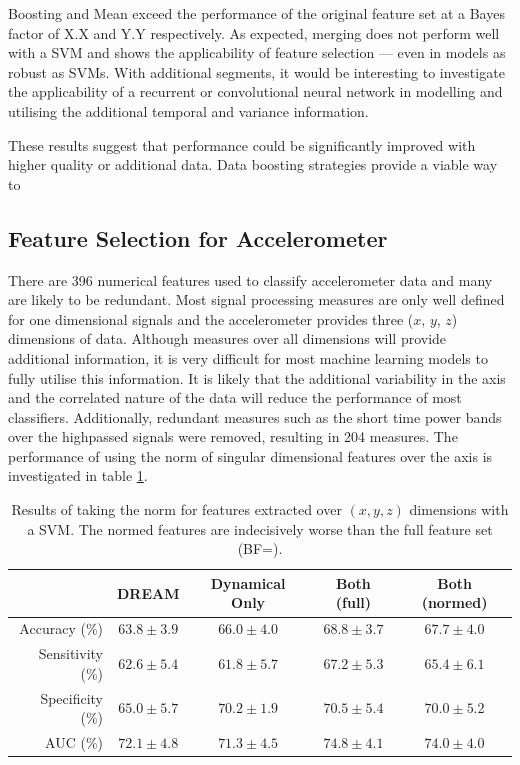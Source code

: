 \documentclass[12pt, twoside]{book}
\begin{document}
Boosting and Mean exceed the performance of the original feature set at a Bayes factor of X.X and Y.Y respectively. As expected, merging does not perform well with a SVM and shows the applicability of feature selection --- even in models as robust as SVMs. With additional segments, it would be interesting to investigate the applicability of a recurrent or convolutional neural network in modelling and utilising the additional temporal and variance information.

These results suggest that performance could be significantly improved with higher quality or additional data. Data boosting strategies provide a viable way to 



\subsection{Feature Selection for Accelerometer}
There are 396 numerical features used to classify accelerometer data and many are likely to be redundant. Most signal processing measures are only well defined for one dimensional signals and the accelerometer provides three ($x$, $y$, $z$) dimensions of data. Although measures over all dimensions will provide additional information, it is very difficult for most machine learning models to fully utilise this information. It is likely that the additional variability in the axis and the correlated nature of the data will reduce the performance of most classifiers. Additionally, redundant measures such as the short time power bands over the highpassed signals were removed, resulting in 204 measures. The performance of using the norm of singular dimensional features over the axis is investigated in table \ref{accelerometernorm}.

\begin{table}[h]
	\caption{Results of taking the norm for features extracted over $(x,y,z)$ dimensions with a SVM. The normed features are indecisively worse than the full feature set (BF=).}
	\label{accelerometernorm}
	\centering
	\begin{tabular}{@{}rcccc@{}}
		&  DREAM & Dynamical Only & Both (full) & Both (normed) \\ \midrule
		Accuracy (\%)    &      $63.8\pm3.9$ &                       $66.0\pm4.0$                                  &     $68.8\pm3.7$
		&						$67.7\pm4.0$\\ \midrule
		Sensitivity (\%) &      $62.6\pm5.4$ &                       $61.8\pm5.7$                                  &     $67.2\pm5.3$
		&					    $65.4\pm6.1$\\ \midrule
		Specificity (\%) &      $65.0\pm5.7$ &                       $70.2\pm1.9$                                  &     $70.5\pm5.4$
		&					    $70.0\pm5.2$\\ \midrule
		AUC (\%)         &      $72.1\pm4.8$ &                       $71.3\pm4.5$                                  &     $74.8\pm4.1$
		&				 		$74.0\pm4.0$\\ \midrule
	\end{tabular}
\end{table}
\end{document}
